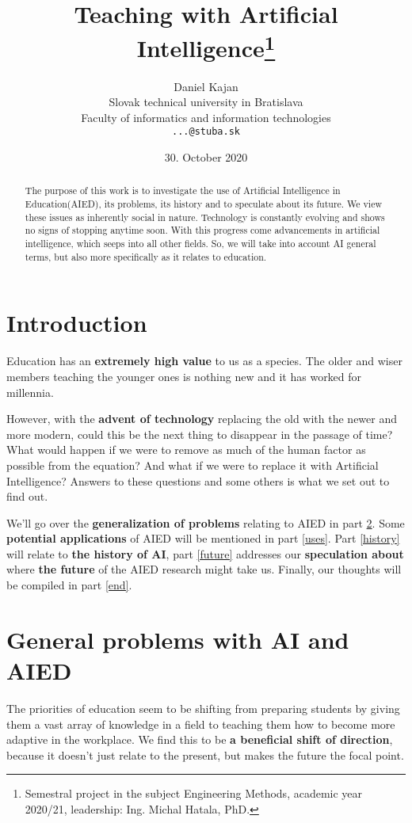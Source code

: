 \documentclass[10pt,a4paper,]{article}
\title{Teaching with Artificial Intelligence\thanks{Semestral project in the subject Engineering Methods, academic year 2020/21, leadership: Ing. Michal Hatala, PhD.}}
\author{Daniel Kajan\\
	{\small Slovak technical university in Bratislava}\\
	{\small Faculty of informatics and information technologies}\\
	{\small \texttt{...@stuba.sk}}
	}
\date{\small 30. October 2020}
\begin{document}
\maketitle

\begin{abstract}
The purpose of this work is to investigate the use of Artificial Intelligence in Education(AIED), its problems, its history and to speculate about its future. We view these issues as inherently social in nature. Technology is constantly evolving and shows no signs of stopping anytime soon. With this progress come advancements in artificial intelligence, which seeps into all other fields. So, we will take into account AI general terms, but also more specifically as it relates to education.
\end{abstract}



\section{Introduction}

Education has an \textbf{extremely high value} to us as a species. The older and wiser members teaching the
younger ones is nothing new and it has worked for millennia. 

However, with the \textbf{advent of technology} replacing the old with the newer and more modern, could this be the next thing to disappear in the passage of time? What would happen if we were to remove as much of the human factor as possible from the equation? And what if we were to replace it with Artificial Intelligence? Answers to these questions and some others is what we set out to find out.

We'll go over the \textbf{generalization of problems} relating to AIED in part \ref{general}. Some \textbf{potential applications} of AIED will be mentioned in part \ref{uses}. Part \ref{history} will relate to \textbf{the history of AI}, part \ref{future} addresses our \textbf{speculation about} where \textbf{the future} of the AIED research might take us. Finally, our thoughts will be compiled in part \ref{end}.

\section{General problems with AI and AIED} \label{general}

The priorities of education seem to be shifting from preparing students by giving them a vast array of knowledge in a field to teaching them how to become more adaptive in the workplace.\cite{Roll2016} We find this to be \textbf{a beneficial shift of direction}, because it doesn't just relate to the present, but makes the future the focal point.
\end{document}
